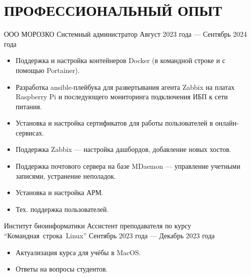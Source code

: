 \section{ПРОФЕССИОНАЛЬНЫЙ ОПЫТ}

    \job
        {ООО МОРОЗКО}
        {Системный администратор}
        {Август 2023 года --- Сентябрь 2024 года}

        \begin{itemize}
            \setlength\itemsep{-.5em}
            \item Поддержка и настройка контейнеров Docker (в командной строке и с помощью Portainer).
            \item Разработка ansible-плейбука для развертывания агента Zabbix на платах Raspberry Pi и последующего мониторинга подключения ИБП к сети питания.
            \item Установка и настройка сертификатов для работы пользователей в онлайн-сервисах.
            \item Поддержка Zabbix — настройка дашбордов, добавление новых хостов.
            \item Поддержка почтового сервера на базе MDaemon — управление учетными записями, устранение неполадок.
            \item Установка и настройка АРМ.
            \item Тех. поддержка пользователей.
        \end{itemize}

        \vspace{-0.5em}
    
    \job
        {Институт биоинформатики}
        {Ассистент преподавателя по курсу “\mbox{Командная}~строка~Linux”}
        {Сентябрь 2023 года — Декабрь 2023 года}

        \begin{itemize}
            \setlength\itemsep{-.5em}
            \item Актуализация курса для учёбы в MacOS.
            \item Ответы на вопросы студентов.
        \end{itemize}
